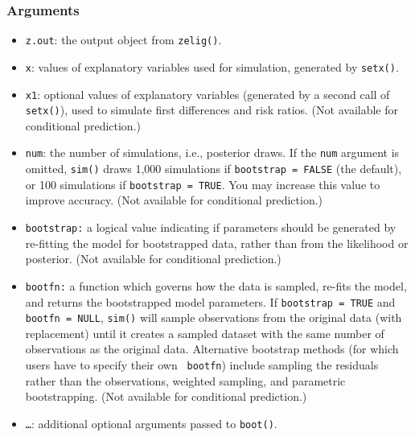 \subsubsection{Arguments}
\begin{itemize}
  \item {\tt z.out}: the output object from \texttt{zelig()}.
  \item {\tt x}: values of explanatory variables used
    for simulation, generated by {\tt setx()}.  
  \item {\tt x1}: optional values of explanatory variables (generated
    by a second call of {\tt setx()}), used to simulate first
    differences and risk ratios.  (Not available for conditional prediction.)
  \item {\tt num}: the number of simulations, i.e., posterior draws.
    If the \texttt{num} argument is omitted, \texttt{sim()} draws 1,000
    simulations if {\tt bootstrap = FALSE} (the default), or
    100 simulations if {\tt bootstrap = TRUE}.  You may increase this
    value to improve accuracy.  (Not available for conditional prediction.)
  \item {\tt bootstrap:} a logical value indicating if parameters
    should be generated by re-fitting the model for bootstrapped
    data, rather than from the likelihood or posterior.  (Not
    available for conditional prediction.)
  \item {\tt bootfn:} a function which governs how the data is
    sampled, re-fits the model, and returns the bootstrapped model
    parameters.  If {\tt bootstrap = TRUE} and {\tt bootfn = NULL},
    {\tt sim()} will sample observations from the original data (with
    replacement) until it creates a sampled dataset with the same
    number of observations as the original data.  Alternative
    bootstrap methods (for which users have to specify their own {\tt
bootfn}) include sampling the residuals rather than the
    observations, weighted sampling, and parametric bootstrapping.
    (Not available for conditional prediction.)  
  \item {\tt \dots}: additional optional arguments passed to
    \texttt{boot()}.  
\end{itemize}

